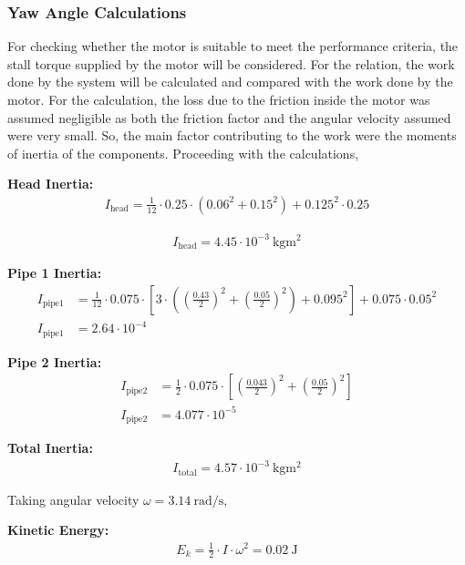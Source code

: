 \documentclass[12pt]{report}
\begin{document}
\subsubsection{Yaw Angle Calculations}

For checking whether the motor is suitable to meet the performance criteria, the stall torque supplied by the motor will be considered. For the relation, the work done by the system will be calculated and compared with the work done by the motor. For the calculation, the loss due to the friction inside the motor was assumed negligible as both the friction factor and the angular velocity assumed were very small. So, the main factor contributing to the work were the moments of inertia of the components. Proceeding with the calculations,

\textbf{Head Inertia:}
\begin{align}
I_\text{head} = \frac{1}{12} \cdot 0.25 \cdot \left(0.06^2 + 0.15^2\right) + 0.125^2 \cdot 0.25
\end{align}

\begin{align}
I_\text{head} = 4.45 \cdot 10^{-3}\ \si{\kilogram\meter\squared}
\end{align}

\textbf{Pipe 1 Inertia:}
\begin{align}
I_\text{pipe1} &= \frac{1}{12} \cdot 0.075 \cdot \left[ 3 \cdot \left( \left(\frac{0.43}{2}\right)^2 + \left(\frac{0.05}{2}\right)^2 \right) + 0.095^2 \right] + 0.075 \cdot 0.05^2
\\
I_\text{pipe1} &= 2.64 \cdot 10^{-4}
\end{align}

\textbf{Pipe 2 Inertia:}
\begin{align}
I_\text{pipe2} &= \frac{1}{2} \cdot 0.075 \cdot \left[ \left(\frac{0.043}{2}\right)^2 + \left(\frac{0.05}{2}\right)^2 \right]
\\
I_\text{pipe2} &= 4.077 \cdot 10^{-5}
\end{align}

\textbf{Total Inertia:}
\begin{align}
I_\text{total} = 4.57 \cdot 10^{-3}\ \si{\kilogram\meter\squared}
\end{align}

Taking angular velocity \(\omega = 3.14\ \si{\radian\per\second}\),

\textbf{Kinetic Energy:}
\begin{align}
E_k = \frac{1}{2} \cdot I \cdot \omega^2 = 0.02\ \si{\joule}
\end{align}
\end{document}
